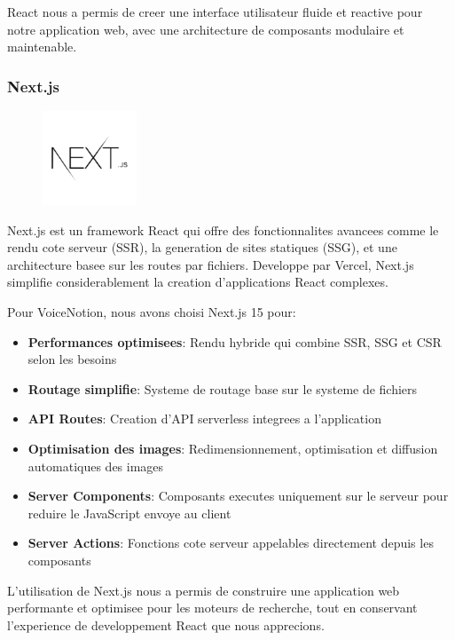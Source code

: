React nous a permis de creer une interface utilisateur fluide et reactive pour notre application web, avec une architecture de composants modulaire et maintenable.

\subsubsection{Next.js}
\begin{figure}
    \centering
    \includegraphics[width=0.25\textwidth]{assets/docs/logo_nextjs.png}
\end{figure}
Next.js est un framework React qui offre des fonctionnalites avancees comme le rendu cote serveur (SSR), la generation de sites statiques (SSG), et une architecture basee sur les routes par fichiers. Developpe par Vercel, Next.js simplifie considerablement la creation d'applications React complexes.

Pour VoiceNotion, nous avons choisi Next.js 15 pour:

\begin{itemize}
    \item \textbf{Performances optimisees}: Rendu hybride qui combine SSR, SSG et CSR selon les besoins
    \item \textbf{Routage simplifie}: Systeme de routage base sur le systeme de fichiers
    \item \textbf{API Routes}: Creation d'API serverless integrees a l'application
    \item \textbf{Optimisation des images}: Redimensionnement, optimisation et diffusion automatiques des images
    \item \textbf{Server Components}: Composants executes uniquement sur le serveur pour reduire le JavaScript envoye au client
    \item \textbf{Server Actions}: Fonctions cote serveur appelables directement depuis les composants
\end{itemize}

L'utilisation de Next.js nous a permis de construire une application web performante et optimisee pour les moteurs de recherche, tout en conservant l'experience de developpement React que nous apprecions.

